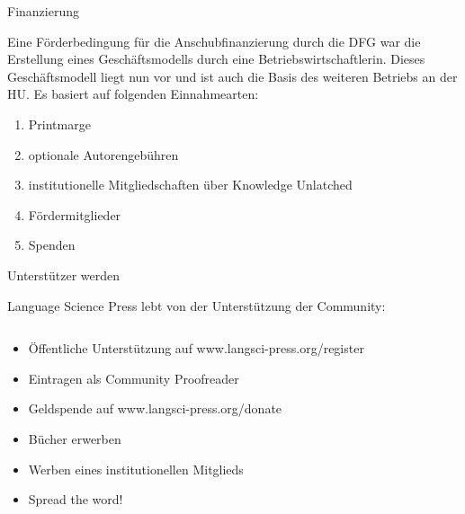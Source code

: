 \documentclass[final,utf8]{beamer}
\begin{document}
\begin{frame}{}
\begin{columns}[t]
\begin{column}{.45\linewidth}
    
    \begin{block}{Finanzierung} 
	\parbox{.9\textwidth}{
Eine F\"orderbedingung f\"ur die Anschubfinanzierung durch die DFG war die Erstellung eines Gesch\"aftsmodells durch eine Betriebswirtschaftlerin. Dieses Gesch\"aftsmodell liegt nun vor und ist auch die Basis des weiteren Betriebs an der HU. Es basiert auf folgenden Einnahmearten:
	\begin{enumerate} 
	    \item Printmarge
	    \item optionale Autorengeb\"uhren
	    \item institutionelle Mitgliedschaften \"uber Knowledge Unlatched
	    \item F\"ordermitglieder
	    \item Spenden
	\end{enumerate}  
}
    \end{block} 



    \begin{block}{Unterst\"utzer werden}

Language Science Press lebt von der Unterst\"utzung der Community: 
      \begin{columns}

	\begin{column}{.65\textwidth}
\begin{itemize}
 \item \"Offentliche Unterst\"utzung auf www.langsci-press.org/register
 \item Eintragen als Community Proofreader 
 \item Geldspende auf www.langsci-press.org/donate
 \item B\"ucher erwerben
 \item Werben eines institutionellen Mitglieds 
 \item Spread the word!
\end{itemize}


\end{column}
\end{columns}
\end{block}
\end{column}
\end{columns}
\end{frame}
\end{document}
